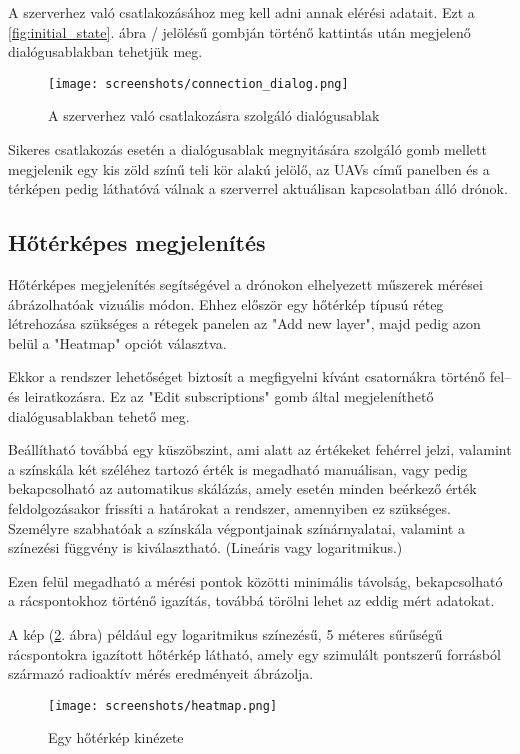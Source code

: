 A szerverhez való csatlakozásához meg kell adni annak elérési adatait. Ezt a
\ref{fig:initial_state}. ábra / jelölésű gombján történő kattintás
után megjelenő dialógusablakban tehetjük meg.

\begin{figure}[H]
  \center
  \texttt{[image: screenshots/connection\_dialog.png]}
  \caption{A szerverhez való csatlakozásra szolgáló dialógusablak}
  \label{fig:connection_dialog}
\end{figure}

Sikeres csatlakozás esetén a dialógusablak megnyitására szolgáló gomb mellett
megjelenik egy kis zöld színű teli kör alakú jelölő, az UAVs című panelben és a
térképen pedig láthatóvá válnak a szerverrel aktuálisan kapcsolatban álló
drónok.


\subsection{Hőtérképes megjelenítés}

Hőtérképes megjelenítés segítségével a drónokon elhelyezett műszerek mérései
ábrázolhatóak vizuális módon. Ehhez először egy hőtérkép típusú réteg
létrehozása szükséges a rétegek panelen az "Add new layer", majd pedig azon
belül a "Heatmap" opciót választva.

Ekkor a rendszer lehetőséget biztosít a megfigyelni kívánt csatornákra történő
fel-- és leiratkozásra. Ez az "Edit subscriptions" gomb által megjeleníthető
dialógusablakban tehető meg.

Beállítható továbbá egy küszöbszint, ami alatt az értékeket fehérrel jelzi,
valamint a színskála két széléhez tartozó érték is megadható manuálisan, vagy
pedig bekapcsolható az automatikus skálázás, amely esetén minden beérkező érték
feldolgozásakor frissíti a határokat a rendszer, amennyiben ez szükséges.
Személyre szabhatóak a színskála végpontjainak színárnyalatai, valamint a
színezési függvény is kiválasztható. (Lineáris vagy logaritmikus.)

Ezen felül megadható a mérési pontok közötti minimális távolság, bekapcsolható a
rácspontokhoz történő igazítás, továbbá törölni lehet az eddig mért adatokat.

A kép (\ref{fig:heatmap}. ábra) például egy logaritmikus színezésű, 5 méteres
sűrűségű rácspontokra igazított hőtérkép látható, amely egy szimulált pontszerű
forrásból származó radioaktív mérés eredményeit ábrázolja.

\begin{figure}[H]
  \center
  \texttt{[image: screenshots/heatmap.png]}
  \caption{Egy hőtérkép kinézete}
  \label{fig:heatmap}
\end{figure}


